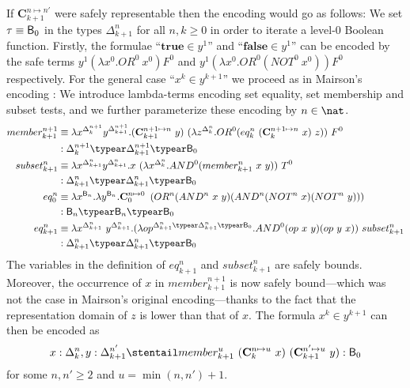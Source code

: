 If $\mathbf{C}^{n\mapsto n'}_{k+1}$ were safely representable then the encoding would go as follows: We set $\tau \equiv \mathsf{B}_0$ in the types  $\Delta_{k+1}^n$ for all $n,k\geq 0$ in order to iterate a level-$0$ Boolean function.
Firstly, the formulae ``$\mathbf{true} \in y^1$'' and ``$\mathbf{false} \in y^1$'' can be encoded by the safe terms $y^1 (\lambda x^0 . OR^0~x^0) F^0$ and $y^1 (\lambda x^0. OR^0(NOT^0~x^0)) F^0$ respectively.
For the general case ``$x^k\in y^{k+1}$''
we proceed as in Mairson's encoding \cite{mairson1992spt}: We introduce lambda-terms encoding set equality, set membership and subset tests, and we further parameterize these encoding by $n\in\nat$.
\begin{align*}
member_{k+1}^{n+1} &\equiv \lambda x^{\Delta_k^{n+1}} y^{\Delta_{k+1}^{n+1}}.
(\mathbf{C}_{k+1}^{n+1\mapsto n}~y)~(\lambda z^{\Delta_k^n} . OR^0 (eq_k^n~(\mathbf{C}^{n+1\mapsto n}_k~x)~z))~F^0\\
  & : \Delta_k^{n+1} \typear \Delta_{k+1}^{n+1} \typear \booltype_0
\\
subset_{k+1}^n &\equiv \lambda x^{\Delta_{k+1}^n} y^{\Delta_{k+1}^n}.
x~(\lambda x^{\Delta_k^n} . AND^0 (member_{k+1}^n~x~y))~T^0 \\
  & : \Delta_{k+1}^n \typear \Delta_{k+1}^n \typear\booltype_0
\\
eq_0^n &\equiv \lambda x^{\booltype_n} .\lambda y^{\booltype_n}. \mathbf{C}_0^{n\mapsto 0}~ \left(OR^n (AND^n~x~y) (AND^n (NOT^n~x)(NOT^n~y))\right) \\
 &: \booltype_n \typear \booltype_n \typear\booltype_0
\\
eq_{k+1}^n &\equiv \lambda x^{\Delta_{k+1}^n}~ y^{\Delta_{k+1}^n}.
   (\lambda op^{\Delta_{k+1}^n\typear\Delta_{k+1}^n\typear\booltype_0}. AND^0 (op~x~y)(op~y~x))~subset_{k+1}^n \\
  & : \Delta_{k+1}^n \typear \Delta_{k+1}^n \typear \booltype_0
\end{align*}
The variables in the definition of $eq_{k+1}^n$ and $subset_{k+1}^n$
are safely bounds. Moreover, the occurrence of $x$ in
$member_{k+1}^{n+1}$ is now safely bound---which was not the case in
Mairson's original encoding---thanks to the fact that the
representation domain of $z$ is lower than that of $x$. The formula
$x^k\in y^{k+1}$ can then be encoded as
$$x:\Delta_k^n, y:\Delta_{k+1}^{n'}\stentail member_{k+1}^{u}~ (\mathbf{C}_k^{n\mapsto u}~x)~(\mathbf{C}^{n'\mapsto u}_{k+1} ~y) : \booltype_0$$
for some $n,n'\geq 2$ and $u = \min(n,n')+1$.

